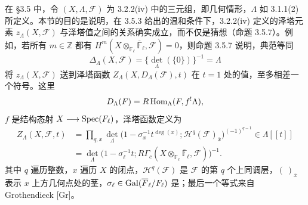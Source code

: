 在 §3.5 中，令 $(X,\Lambda,\mathcal F)$ 为 3.2.2(iv) 中的三元组，即几何情形，$\Lambda$ 如 3.1.1(2) 所定义。本节的目的是说明，在 3.5.3 给出的温和条件下，3.2.2(iv) 定义的泽塔元素 $z_\Lambda(X,\mathcal F)$ 与泽塔值之间的关系确实成立，而不仅是猜想（命题 3.5.7）。例如，若所有 $m\in\mathbb Z$ 都有 $H^m(X\otimes_{\mathbb F_\ell}\overline{\mathbb F}_\ell,\mathcal F)=0$，则命题 3.5.7 说明，典范等同
\[
 \Delta_\Lambda(X,\mathcal F)=\{\det_\Lambda(\{0\})\}^{-1}=\Lambda
\]
将 $z_\Lambda(X,\mathcal F)$ 送到泽塔函数 $Z_\Lambda(X,D_\Lambda(\mathcal F),t)$ 在 $t=1$ 处的值，至多相差一个符号。这里
\[
 D_\Lambda(F)=R\operatorname{Hom}_\Lambda(F,f^!\Lambda),
\]
$f$ 是结构态射 $X\longrightarrow\operatorname{Spec}(F_\ell)$，泽塔函数定义为
\begin{align*}
 Z_\Lambda(X,\mathcal F,t)
 &=\prod_{q,x}\det_\Lambda\bigl(1-\sigma_x^{-1}t^{\deg(x)};\mathcal H^q(\mathcal F)_{\bar x}\bigr)^{(-1)^{q-1}}\in\Lambda[[t]]\\
 &=\det_\Lambda\bigl(1-\sigma_\ell^{-1}t;R\Gamma_c(X\otimes_{\mathbb F_\ell}\overline{\mathbb F}_\ell,\mathcal F)\bigr)^{-1}.
\end{align*}
其中 $q$ 遍历整数，$x$ 遍历 $X$ 的闭点，$\mathcal H^q(\mathcal F)$ 是 $\mathcal F$ 的第 $q$ 个上同调层，$(\ )_{\bar x}$ 表示 $x$ 上方几何点处的茎，$\sigma_\ell\in\operatorname{Gal}(\overline{F}_\ell/F_\ell)$ 是；最后一个等式来自 Grothendieck [Gr]。

